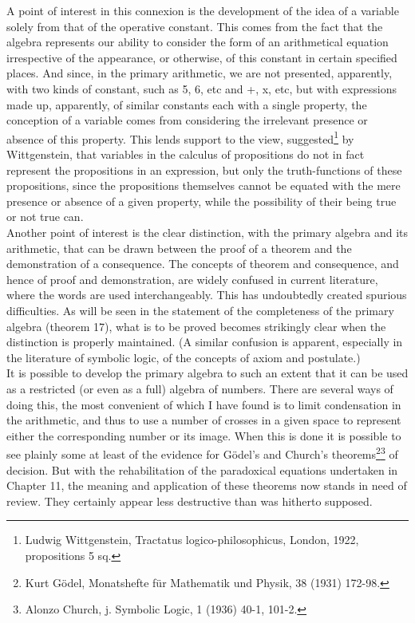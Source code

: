 \documentclass[a4paper]{article}
\theoremstyle{remark}
\begin{document}
A  point  of  interest  in  this  connexion  is  the  development  of  the  idea  of  a  variable  solely from  that  of the  operative  constant.  This   comes   from   the   fact   that   the   algebra   represents   our   ability to consider the form  of an arithmetical  equation  irrespective  of  the  appearance,  or  otherwise,  of  this  constant  in  certain  specified  places.  And  since,  in  the  primary  arithmetic,  we  are  not  presented,  apparently,  with  two  kinds  of  constant,  such  as  5,  6, etc  and  +,  x,  etc,  but  with  expressions  made  up,  apparently,   of   similar  constants   each  with   a   single  property,   the   conception  of  a  variable  comes  from  considering  the  irrelevant  presence  or  absence  of  this  property.  This  lends  support  to  the  view,  suggested\footnote{Ludwig  Wittgenstein, Tractatus logico-philosophicus, London, 1922, propositions 5 sq.}  by  Wittgenstein,  that  variables  in  the  calculus  of  propositions  do  not  in  fact   represent   the  propositions   in   an expression, but only the truth-functions  of these propositions, since  the  propositions  themselves  cannot  be  equated  with  the  mere   presence   or   absence   of   a   given   property,   while   the   possibility  of  their  being  true  or  not  true  can. \\

Another  point  of  interest  is  the  clear  distinction,  with  the  primary  algebra  and  its  arithmetic,  that  can  be  drawn  between  the proof  of  a theorem  and the demonstration  of  a  consequence.  The  concepts  of  theorem  and  consequence,  and  hence  of  proof  and  demonstration,   are  widely  confused   in  current  literature,  where the words are used interchangeably. This has  undoubtedly  created  spurious  difficulties.  As  will  be  seen  in  the  statement  of  the  completeness  of  the  primary  algebra  (theorem   17),  what  is  to  be  proved  becomes  strikingly  clear  when  the  distinction   is   properly  maintained.  (A  similar  confusion  is  apparent,  especially  in the  literature  of  symbolic  logic,  of the  concepts  of  axiom  and  postulate.)\\

It   is  possible  to   develop  the  primary  algebra   to   such   an   extent  that  it  can  be  used  as  a  restricted  (or  even  as  a   full)   algebra  of  numbers.  There  are  several  ways  of  doing  this,  the  most  convenient  of  which  I  have  found  is to  limit  condensation in the arithmetic, and  thus to  use  a number  of crosses in  a  given  space to represent either the corresponding  number  or its image. When  this  is  done  it  is  possible  to  see  plainly  some  at  least  of  the  evidence  for  Gödel's  and  Church's  theorems\footnote{ Kurt Gödel, Monatshefte  
 für Mathematik und Physik, 38 (1931) 172-98.}\footnote{Alonzo Church, j. Symbolic Logic, 1 (1936) 40-1, 101-2.}  of  decision.  But  with  the  rehabilitation  of  the  paradoxical  equations  undertaken   in  Chapter   11,  the  meaning  and   application   of   these   theorems  now  stands  in  need  of  review.  They  certainly  appear  less  destructive  than  was  hitherto  supposed. \\
\end{document}
